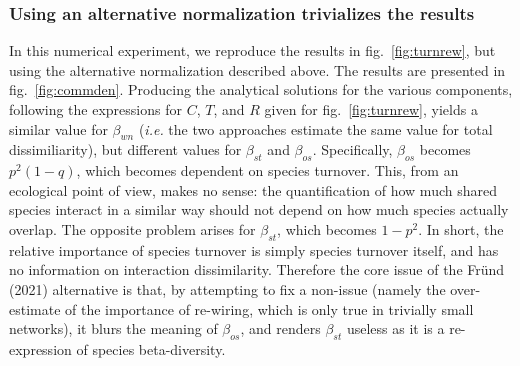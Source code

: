 \documentclass[11pt]{article}
\begin{document}
\hypertarget{using-an-alternative-normalization-trivializes-the-results}{%
\subsubsection{Using an alternative normalization trivializes the
results}\label{using-an-alternative-normalization-trivializes-the-results}}

In this numerical experiment, we reproduce the results in
fig.~\ref{fig:turnrew}, but using the alternative normalization
described above. The results are presented in fig.~\ref{fig:commden}.
Producing the analytical solutions for the various components, following
the expressions for \(C\), \(T\), and \(R\) given for
fig.~\ref{fig:turnrew}, yields a similar value for \(\beta_{wn}\)
(\emph{i.e.} the two approaches estimate the same value for total
dissimiliarity), but different values for \(\beta_{st}\) and
\(\beta_{os}\). Specifically, \(\beta_{os}\) becomes \(p^2(1-q)\), which
becomes dependent on species turnover. This, from an ecological point of
view, makes no sense: the quantification of how much shared species
interact in a similar way should not depend on how much species actually
overlap. The opposite problem arises for \(\beta_{st}\), which becomes
\(1-p^2\). In short, the relative importance of species turnover is
simply species turnover itself, and has no information on interaction
dissimilarity. Therefore the core issue of the Fründ (2021) alternative
is that, by attempting to fix a non-issue (namely the over-estimate of
the importance of re-wiring, which is only true in trivially small
networks), it blurs the meaning of \(\beta_{os}\), and renders
\(\beta_{st}\) useless as it is a re-expression of species
beta-diversity.
\end{document}
